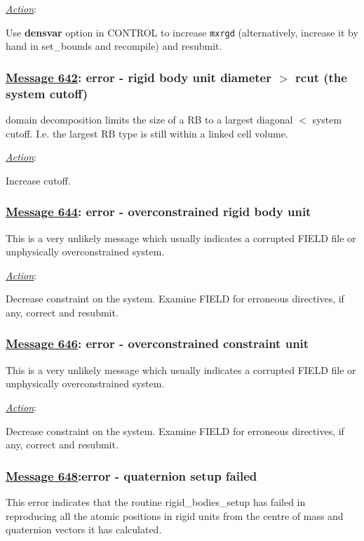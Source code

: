 \noindent \underline{\em Action}:

Use {\bf densvar} option in CONTROL to increase {\tt mxrgd}
(alternatively, increase it by hand in {\sc set\_bounds} and
recompile) and resubmit.

\subsubsection*{\underline{Message 642}: error - rigid body unit diameter $>$ rcut (the system cutoff)}

\D domain decomposition limits the size of a RB to a largest
diagonal $<$ system cutoff.  I.e. the largest RB type is still
within a linked cell volume.

\noindent \underline{\em Action}:

Increase cutoff.

\subsubsection*{\underline{Message 644}: error - overconstrained rigid body unit}

This is a very unlikely message which usually indicates a corrupted FIELD file
or unphysically overconstrained system.

\noindent \underline{\em Action}:

Decrease constraint on the system.  Examine FIELD for erroneous directives,
if any, correct and resubmit.

\subsubsection*{\underline{Message 646}: error - overconstrained constraint unit}

This is a very unlikely message which usually indicates a corrupted FIELD file
or unphysically overconstrained system.

\noindent \underline{\em Action}:

Decrease constraint on the system.  Examine FIELD for erroneous directives,
if any, correct and resubmit.

\subsubsection*{\underline{Message 648}:error - quaternion setup failed}

This error indicates that the routine {\sc rigid\_bodies\_setup} has failed
in reproducing all the atomic positions in rigid units from the centre of mass
and quaternion vectors it has calculated.

